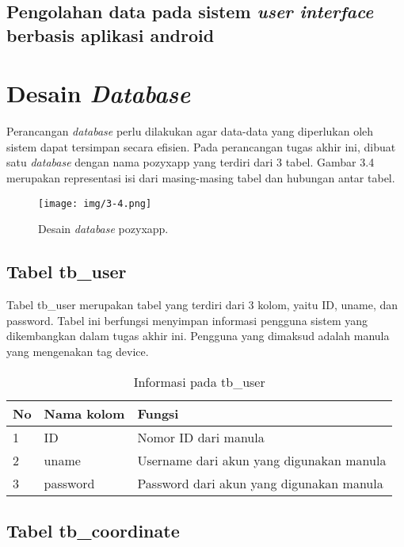 \subsection{Pengolahan data pada sistem \textit{user interface} berbasis aplikasi android}
\vspace{1ex}

\vspace{1ex}
\section{Desain \textit{Database}}
\vspace{1ex}

Perancangan \textit{database} perlu dilakukan agar data-data yang diperlukan oleh sistem dapat tersimpan secara efisien. Pada perancangan tugas akhir ini, dibuat satu \textit{database} dengan nama pozyxapp yang terdiri dari 3 tabel. Gambar 3.4 merupakan representasi isi dari masing-masing tabel dan hubungan antar tabel.
\begin{figure} [!htb]
	\captionsetup{justification=centering}
	\texttt{[image: img/3-4.png]}
	\caption{Desain \textit{database} pozyxapp.}
	\label{fig:3_4}
\end{figure}
\subsection{Tabel tb\_user}
\vspace{1ex}

Tabel tb\_user merupakan tabel yang terdiri dari 3 kolom, yaitu ID, uname, dan password. Tabel ini berfungsi menyimpan informasi pengguna sistem yang dikembangkan dalam tugas akhir ini. Pengguna yang dimaksud adalah manula yang mengenakan tag device.
\begin{table}[]
	\caption{Informasi pada tb\_user}
	\label{tab:tb-user}
	\begin{tabular}{|l|l|p{5cm}|}
		\hline
		\textbf{No} & \textbf{Nama kolom} & \textbf{Fungsi} \\ \hline
		1 & ID & Nomor ID dari manula \\ \hline
		2 & uname & Username dari akun yang digunakan manula \\ \hline
		3 & password & Password dari akun yang digunakan manula \\ \hline
	\end{tabular}
\end{table}
\subsection{Tabel tb\_coordinate}
\vspace{1ex}

